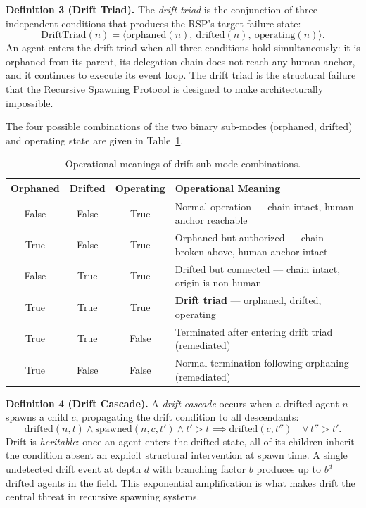 \medskip
\noindent\textbf{Definition 3 (Drift Triad).}
The \emph{drift triad} is the conjunction of three independent conditions that produces the RSP's target failure state:
\begin{equation}
\mathrm{DriftTriad}(n) = \langle \mathrm{orphaned}(n),\ \mathrm{drifted}(n),\ \mathrm{operating}(n) \rangle.
\label{eq:rs-drift-triad}
\end{equation}
An agent enters the drift triad when all three conditions hold simultaneously: it is orphaned from its parent, its delegation chain does not reach any human anchor, and it continues to execute its event loop. The drift triad is the structural failure that the Recursive Spawning Protocol is designed to make architecturally impossible.

The four possible combinations of the two binary sub-modes (orphaned, drifted) and operating state are given in Table~\ref{tab:rs-drift-submodes}.

\begin{table}[h]
\centering
\begin{tabular}{c|c|c|p{5cm}}
\textbf{Orphaned} & \textbf{Drifted} & \textbf{Operating} & \textbf{Operational Meaning} \\ \hline
False & False & True  & Normal operation — chain intact, human anchor reachable \\
True  & False & True  & Orphaned but authorized — chain broken above, human anchor intact \\
False & True  & True  & Drifted but connected — chain intact, origin is non-human \\
True  & True  & True  & \textbf{Drift triad} — orphaned, drifted, operating \\
True  & True  & False & Terminated after entering drift triad (remediated) \\
True  & False & False & Normal termination following orphaning (remediated)
\end{tabular}
\caption{Operational meanings of drift sub-mode combinations.}
\label{tab:rs-drift-submodes}
\end{table}

\medskip
\noindent\textbf{Definition 4 (Drift Cascade).}
A \emph{drift cascade} occurs when a drifted agent $n$ spawns a child $c$, propagating the drift condition to all descendants:
\begin{equation}
\mathrm{drifted}(n, t) \land \mathrm{spawned}(n, c, t') \land t' > t \implies \mathrm{drifted}(c, t'')\quad \forall\, t'' > t'.
\label{eq:rs-drift-cascade}
\end{equation}
Drift is \emph{heritable}: once an agent enters the drifted state, all of its children inherit the condition absent an explicit structural intervention at spawn time. A single undetected drift event at depth $d$ with branching factor $b$ produces up to $b^d$ drifted agents in the field. This exponential amplification is what makes drift the central threat in recursive spawning systems.


